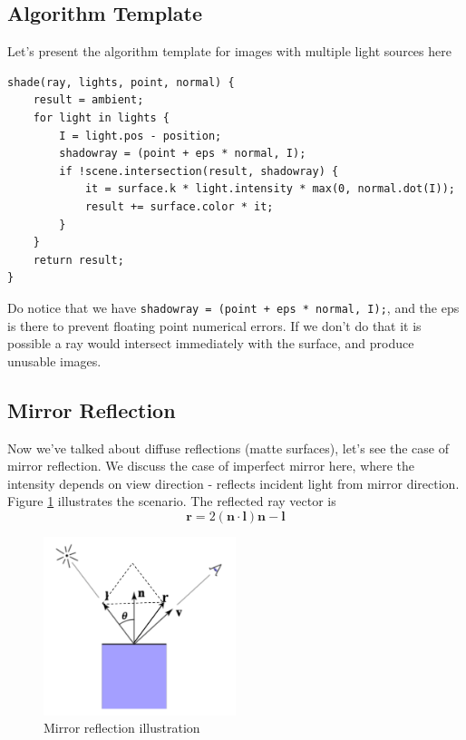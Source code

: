\documentclass[11pt]{article}
\newcommand{\bl}{\mathbf{l}}
\newcommand{\bn}{\mathbf{n}}
\newcommand{\br}{\mathbf{r}}
\begin{document}
\subsection{Algorithm Template}
Let's present the algorithm template for images with multiple light sources here
\begin{mdframed}
	\begin{verbatim}
shade(ray, lights, point, normal) {
    result = ambient; 
    for light in lights {
        I = light.pos - position; 
        shadowray = (point + eps * normal, I); 
        if !scene.intersection(result, shadowray) {
            it = surface.k * light.intensity * max(0, normal.dot(I));
            result += surface.color * it;
        }
    }
    return result; 
}
	\end{verbatim}
\end{mdframed}
Do notice that we have \texttt{shadowray = (point + eps * normal, I);}, and the eps is there to prevent floating point numerical errors. If we don't do that it is possible a ray would intersect immediately with the surface, and produce unusable images. 

\subsection{Mirror Reflection}
Now we've talked about diffuse reflections (matte surfaces), let's see the case of mirror reflection. We discuss the case of imperfect mirror here, where the intensity depends on view direction - reflects incident light from mirror direction. Figure \ref{mirror reflection} illustrates the scenario. The reflected ray vector is 
\begin{equation}
	\br = 2 (\bn \cdot \bl) \bn - \bl
\end{equation}
\begin{figure}
	\centering \includegraphics[width=0.5\textwidth]{figs/mirror reflection}
	\caption{\label{mirror reflection} Mirror reflection illustration}
\end{figure}
\end{document}

